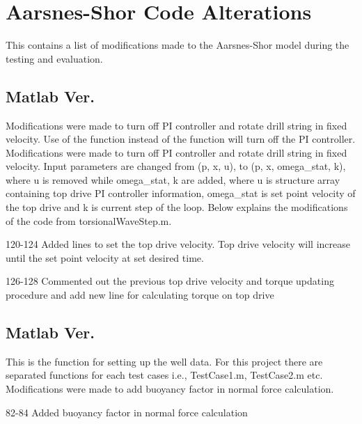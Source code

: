 \chapter{Aarsnes-Shor Code Alterations}
This \appendixname{} contains a list of modifications made to the Aarsnes-Shor model during the testing and evaluation.

\section{Matlab Ver.\ }
Modifications were made to turn off PI controller and rotate drill string in fixed velocity. Use of the function  instead of the function  will turn off the PI controller. Modifications were made to turn off PI controller and rotate drill string in fixed velocity. Input parameters are changed from (p, x, u), to (p, x, omega\_stat, k), where u is removed while omega\_stat, k are added, where u is structure array containing top drive PI controller information, omega\_stat is set point velocity of the top drive and k is current step of the loop. Below explains the modifications of the code from torsionalWaveStep.m.

\begin{codemodifications}
\begin{codemodification}{120-124}
Added lines to set the top drive velocity. Top drive velocity will increase until the set point velocity at set desired time.
\end{codemodification}

\begin{codemodification}{126-128}
Commented out the previous top drive velocity and torque updating procedure and add new line for calculating torque on top drive
\end{codemodification}
\end{codemodifications}

\section{Matlab Ver.\ }
This is the function for setting up the well data. For this project there are separated functions for each test cases i.e., TestCase1.m, TestCase2.m etc. Modifications were made to add buoyancy factor in normal force calculation.
\begin{codemodifications}
\begin{codemodification}{82-84}
Added buoyancy factor in normal force calculation
\end{codemodification}
\end{codemodifications}

